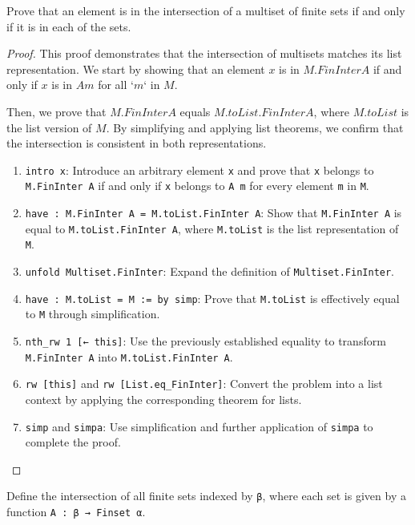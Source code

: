 \begin{lemma}\label{Multiset.eq_FinInter}
  \leanok
  Prove that an element is in the intersection of a multiset of finite sets if and only if it is in each of the sets.
\end{lemma}

\begin{proof}
  \leanok
  This proof demonstrates that the intersection of multisets matches its list representation. We start by showing that an element $x$ is in $M.FinInter A$ if and only if $x$ is in $A m$ for all `$m$` in $M$.

  Then, we prove that $M.FinInter A$ equals $M.toList.FinInter A$, where $M.toList$ is the list version of $M$. By simplifying and applying list theorems, we confirm that the intersection is consistent in both representations.

  \begin{enumerate}
    \item \texttt{intro x}: Introduce an arbitrary element \texttt{x} and prove that \texttt{x} belongs to \texttt{M.FinInter A} if and only if \texttt{x} belongs to \texttt{A m} for every element \texttt{m} in \texttt{M}.
    \item \texttt{have : M.FinInter A = M.toList.FinInter A}: Show that \texttt{M.FinInter A} is equal to \texttt{M.toList.FinInter A}, where \texttt{M.toList} is the list representation of \texttt{M}.
    \item \texttt{unfold Multiset.FinInter}: Expand the definition of \texttt{Multiset.FinInter}.
    \item \texttt{have : M.toList = M := by simp}: Prove that \texttt{M.toList} is effectively equal to \texttt{M} through simplification.
    \item \texttt{nth_rw 1 [← this]}: Use the previously established equality to transform \texttt{M.FinInter A} into \texttt{M.toList.FinInter A}.
    \item \texttt{rw [this]} and \texttt{rw [List.eq\_FinInter]}: Convert the problem into a list context by applying the corresponding theorem for lists.
    \item \texttt{simp} and \texttt{simpa}: Use simplification and further application of \texttt{simpa} to complete the proof.
  \end{enumerate}
\end{proof}

\begin{definition}\label{FinInter₀}
  \leanok
  Define the intersection of all finite sets indexed by \verb|β|, where each set is given by a function \verb|A : β → Finset α|.
\end{definition}

